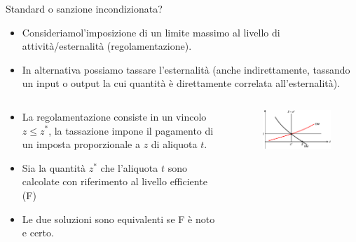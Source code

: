 \documentclass[aspectratio=64,12pt]{beamer}
\begin{document}
\begin{frame}{Standard o sanzione incondizionata?}
\begin{itemize}
\item Consideriamol'imposizione di un \alert{limite massimo} al livello di
attività/esternalità (regolamentazione).
\item In alternativa possiamo \alert{tassare} l'esternalità (anche indirettamente,
tassando un input o output la cui quantità è direttamente correlata
all'esternalità).
\end{itemize}

\begin{columns}
\begin{column}{.5\columnwidth}
\begin{itemize}
\item La regolamentazione consiste in un vincolo $z\le z^*$, la tassazione
impone il pagamento di un imposta proporzionale a $z$ di aliquota $t$.
\item Sia la quantità $z^*$ che l'aliquota $t$ sono calcolate con riferimento
al livello efficiente (F)
\item Le due soluzioni sono equivalenti se F è noto e certo.
\end{itemize}
\end{column}
\begin{column}{.5\columnwidth}
\begin{figure} \centering
\includegraphics[width=\textwidth]{./figure/esternalita-5-color.pdf}
\end{figure}
\end{column}
\end{columns}
\end{frame}
\end{document}
